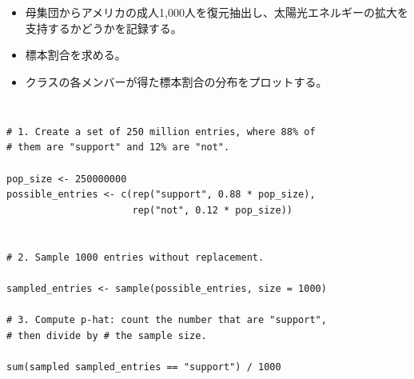 
\begin{frame}
\frametitle{}



\end{frame}


\begin{frame}
\frametitle{}


\begin{itemize}

\item 母集団からアメリカの成人1,000人を復元抽出し、太陽光エネルギーの拡大を支持するかどうかを記録する。

\item 標本割合を求める。

\item クラスの各メンバーが得た標本割合の分布をプロットする。

\end{itemize}

\end{frame}


\begin{frame}[fragile]
\frametitle{}

\begin{beamerboxesrounded}[shadow = true, lower = code body]{}
{
\small
\begin{verbatim}

# 1. Create a set of 250 million entries, where 88% of
# them are "support" and 12% are "not".

pop_size <- 250000000
possible_entries <- c(rep("support", 0.88 * pop_size),
                      rep("not", 0.12 * pop_size))


# 2. Sample 1000 entries without replacement.

sampled_entries <- sample(possible_entries, size = 1000)

# 3. Compute p-hat: count the number that are "support",
# then divide by # the sample size.

sum(sampled sampled_entries == "support") / 1000

\end{verbatim}
}
\end{beamerboxesrounded}

\end{frame}

